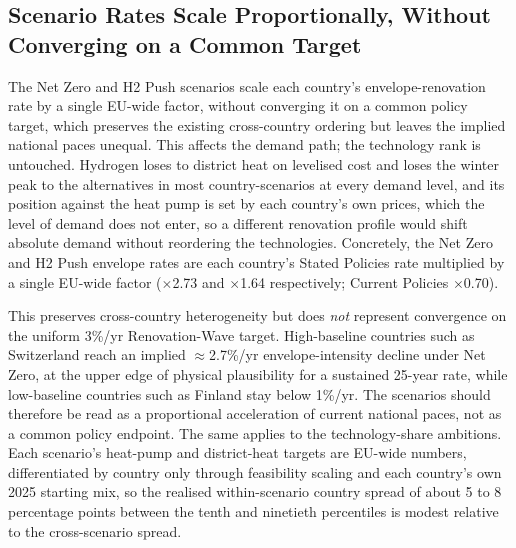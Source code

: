 \subsection{Scenario Rates Scale Proportionally, Without Converging on a Common Target}
The Net Zero and H2 Push scenarios scale each country's envelope-renovation rate by a
single EU-wide factor, without converging it on a common policy target, which preserves
the existing cross-country ordering but leaves the implied national paces unequal. This
affects the demand path; the technology rank is untouched. Hydrogen loses to district
heat on levelised cost and loses the winter peak to the alternatives in most
country-scenarios at every demand level, and its position against the heat pump is set
by each country's own prices, which the level of demand does not enter, so a different
renovation profile would shift absolute demand without reordering the technologies.
Concretely, the Net Zero and H2 Push envelope rates are each country's Stated Policies
rate multiplied by a single EU-wide factor ($\times$2.73 and $\times$1.64 respectively;
Current Policies $\times$0.70).

This preserves cross-country heterogeneity but does \emph{not} represent convergence on
the uniform 3\%/yr Renovation-Wave target. High-baseline countries such as Switzerland
reach an implied $\approx$2.7\%/yr envelope-intensity decline under Net Zero, at the
upper edge of physical plausibility for a sustained 25-year rate, while low-baseline
countries such as Finland stay below 1\%/yr. The scenarios should therefore be read as a
proportional acceleration of current national paces, not as a common policy endpoint.
The same applies to the technology-share ambitions. Each scenario's heat-pump and
district-heat targets are EU-wide numbers, differentiated by country only through
feasibility scaling and each country's own 2025 starting mix, so the realised
within-scenario country spread of about 5 to 8 percentage points between the tenth and
ninetieth percentiles is modest relative to the cross-scenario spread.


